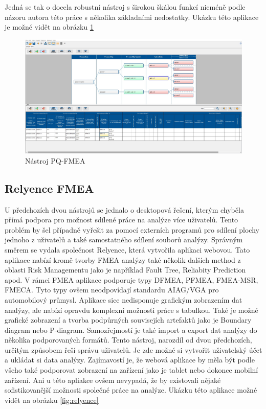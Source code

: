Jedná se tak o docela robustní nástroj s širokou škálou funkcí nicméně podle názoru autora této práce s několika základními nedostatky. Ukázku této aplikace je možné vidět na obrázku \ref{fig:pq}

\begin{figure}[h]
\centering
	\includegraphics[width=1.0\textwidth]{Figures/pq.jpg}
	\caption{Nástroj PQ-FMEA }
	\label{fig:pq}
\end{figure}

\subsection{Relyence FMEA}
U předchozích dvou nástrojů se jednalo o desktopová řešení, kterým chyběla přímá podpora pro možnost sdílené práce na analýze více uživatelů. Tento problém by šel případně vyřešit za pomocí externích programů pro sdílení plochy jednoho z uživatelů a také samostatného sdílení souborů analýzy. Správným směrem se vydala společnost Relyence, která vytvořila aplikaci webovou. \cite{relyenceFMEA}  Tato aplikace nabízí kromě tvorby FMEA analýzy také několik dalších method z oblasti Risk Managementu jako je například Fault Tree, Reliabity Prediction apod. V rámci FMEA aplikace podporuje typy DFMEA, PFMEA, FMEA-MSR, FMECA. Tyto typy ovšem neodpovídají standardu AIAG/VGA pro automobilový průmysl. Aplikace sice nedisponuje grafickým zobrazením dat analýzy, ale nabízí opravdu komplexní možnosti práce s tabulkou. Také je možné grafické zobrazení a tvorba podpůrných souvisejích artefaktů jako je Boundary diagram nebo P-diagram. Samozřejmostí je také import a export dat analýzy do několika podporovaných formátů. Tento nástroj, narozdíl od dvou předchozích, určitým způsobem řeší správu uživatelů. Je zde možné si vytvořit uživatelský účet a ukládat si data analýzy. Zajímavostí je, že webová aplikace by měla být podle všeho také podporovat zobrazení na zařízení jako je tablet nebo dokonce mobilní zařízení. Ani u této apliakce ovšem nevypadá, že by existovali nějaké sofistikovanější možnosti společné práce na analýze. Ukázku této aplikace možné vidět na obrázku  \ref{fig:relyence}

